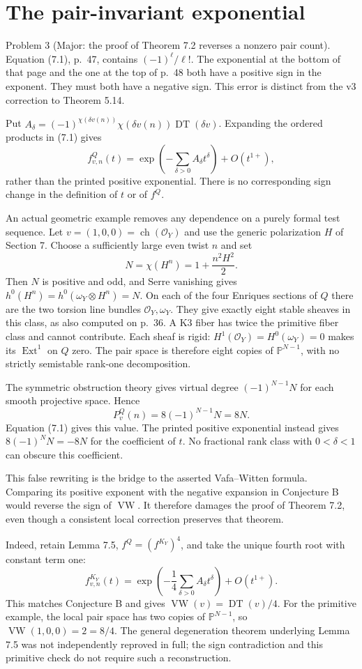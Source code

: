 \documentclass[10pt]{article}
\begin{document}
\section*{The pair-invariant exponential}
Problem 3 (Major: the proof of Theorem 7.2 reverses a nonzero pair count).  Equation (7.1), p. 47, contains \((-1)^\ell/\ell!\). The exponential at the bottom of that page and the one at the top of p. 48 both have a positive sign in the exponent. They must both have a negative sign. This error is distinct from the v3 correction to Theorem 5.14.\par
Put \(A_\delta=(-1)^{\chi(\delta v(n))}
\chi(\delta v(n))\mathop{\mathrm{DT}}(\delta v)\). Expanding the ordered products in (7.1) gives \[f^Q_{v,n}(t)=
 \exp\left(-\sum_{\delta>0} A_\delta t^\delta\right)
      +O(t^{1+}),\] rather than the printed positive exponential. There is no corresponding sign change in the definition of \(t\) or of \(f^Q\).\par
An actual geometric example removes any dependence on a purely formal test sequence. Let \(v=(1,0,0)=\operatorname{ch}(\mathcal O_Y)\) and use the generic polarization \(H\) of Section 7. Choose a sufficiently large even twist \(n\) and set \[N=\chi(H^n)=1+\frac{n^2H^2}{2}.\] Then \(N\) is positive and odd, and Serre vanishing gives \(h^0(H^n)=h^0(\omega_Y\otimes H^n)=N\). On each of the four Enriques sections of \(Q\) there are the two torsion line bundles \(\mathcal O_Y,\omega_Y\). They give exactly eight stable sheaves in this class, as also computed on p. 36. A K3 fiber has twice the primitive fiber class and cannot contribute. Each sheaf is rigid: \(H^1(\mathcal O_Y)=H^0(\omega_Y)=0\) makes its \(\operatorname{Ext}^1\) on \(Q\) zero. The pair space is therefore eight copies of \(\mathbb P^{N-1}\), with no strictly semistable rank-one decomposition.\par
The symmetric obstruction theory gives virtual degree \((-1)^{N-1}N\) for each smooth projective space. Hence \[P_v^Q(n)=8(-1)^{N-1}N=8N.\] Equation (7.1) gives this value. The printed positive exponential instead gives \(8(-1)^N N=-8N\) for the coefficient of \(t\). No fractional rank class with \(0<\delta<1\) can obscure this coefficient.\par
This false rewriting is the bridge to the asserted Vafa–Witten formula. Comparing its positive exponent with the negative expansion in Conjecture B would reverse the sign of \(\mathop{\mathrm{VW}}\). It therefore damages the proof of Theorem 7.2, even though a consistent local correction preserves that theorem.\par
Indeed, retain Lemma 7.5, \(f^Q=(f^{K_Y})^4\), and take the unique fourth root with constant term one: \[f^{K_Y}_{v,n}(t)=
 \exp\left(-\frac14\sum_{\delta>0} A_\delta t^\delta\right)
       +O(t^{1+}).\] This matches Conjecture B and gives \(\mathop{\mathrm{VW}}(v)=\mathop{\mathrm{DT}}(v)/4\). For the primitive example, the local pair space has two copies of \(\mathbb P^{N-1}\), so \(\mathop{\mathrm{VW}}(1,0,0)=2=8/4\). The general degeneration theorem underlying Lemma 7.5 was not independently reproved in full; the sign contradiction and this primitive check do not require such a reconstruction.\par
\end{document}
